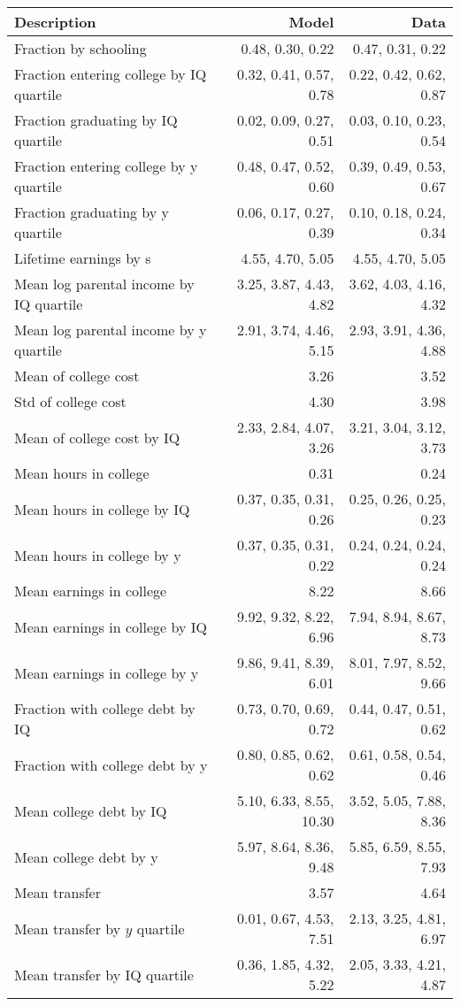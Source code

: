 \begin{tabular}{lrr}
\hline
Description & Model  & Data  \\
\hline
Fraction by schooling & 0.48, 0.30, 0.22  & 0.47, 0.31, 0.22  \\
Fraction entering college by IQ quartile & 0.32, 0.41, 0.57, 0.78  & 0.22, 0.42, 0.62, 0.87  \\
Fraction graduating by IQ quartile & 0.02, 0.09, 0.27, 0.51  & 0.03, 0.10, 0.23, 0.54  \\
Fraction entering college by y quartile & 0.48, 0.47, 0.52, 0.60  & 0.39, 0.49, 0.53, 0.67  \\
Fraction graduating by y quartile & 0.06, 0.17, 0.27, 0.39  & 0.10, 0.18, 0.24, 0.34  \\
Lifetime earnings by s & 4.55, 4.70, 5.05  & 4.55, 4.70, 5.05  \\
Mean log parental income by IQ quartile & 3.25, 3.87, 4.43, 4.82  & 3.62, 4.03, 4.16, 4.32  \\
Mean log parental income by y quartile & 2.91, 3.74, 4.46, 5.15  & 2.93, 3.91, 4.36, 4.88  \\
Mean of college cost & 3.26  & 3.52  \\
Std of college cost & 4.30  & 3.98  \\
Mean of college cost by IQ & 2.33, 2.84, 4.07, 3.26  & 3.21, 3.04, 3.12, 3.73  \\
Mean hours in college & 0.31  & 0.24  \\
Mean hours in college by IQ & 0.37, 0.35, 0.31, 0.26  & 0.25, 0.26, 0.25, 0.23  \\
Mean hours in college by y & 0.37, 0.35, 0.31, 0.22  & 0.24, 0.24, 0.24, 0.24  \\
Mean earnings in college & 8.22  & 8.66  \\
Mean earnings in college by IQ & 9.92, 9.32, 8.22, 6.96  & 7.94, 8.94, 8.67, 8.73  \\
Mean earnings in college by y & 9.86, 9.41, 8.39, 6.01  & 8.01, 7.97, 8.52, 9.66  \\
Fraction with college debt by IQ & 0.73, 0.70, 0.69, 0.72  & 0.44, 0.47, 0.51, 0.62  \\
Fraction with college debt by y & 0.80, 0.85, 0.62, 0.62  & 0.61, 0.58, 0.54, 0.46  \\
Mean college debt by IQ & 5.10, 6.33, 8.55, 10.30  & 3.52, 5.05, 7.88, 8.36  \\
Mean college debt by y & 5.97, 8.64, 8.36, 9.48  & 5.85, 6.59, 8.55, 7.93  \\
Mean transfer & 3.57  & 4.64  \\
Mean transfer by $y$ quartile & 0.01, 0.67, 4.53, 7.51  & 2.13, 3.25, 4.81, 6.97  \\
Mean transfer by IQ quartile & 0.36, 1.85, 4.32, 5.22  & 2.05, 3.33, 4.21, 4.87  \\
\hline
\end{tabular}%
